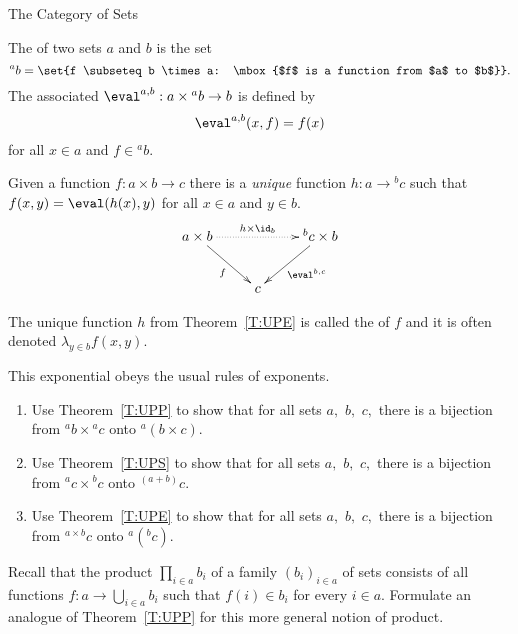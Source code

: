 \begin{unit}{The Category of Sets}
\begin{definition}
  The  of two sets \(a\) and \(b\) is the set \[{}^ab = \set{f \subseteq b \times a: \mbox{$f$ is a function from $a$ to $b$}}.\]
  The associated  \(\eval^{a,b}:a \times {}^ab \to b\) is defined by \[\eval^{a,b}(x,f) = f(x)\] for all \(x \in a\) and \(f \in {}^ab.\)  
\end{definition}

\begin{theorem}\label{T:UPE}
  Given a function \(f:a \times b \to c\) there is a \emph{unique} function \(h:a \to {}^bc\) such that \(f(x,y) = \eval(h(x),y)\) for all \(x \in a\) and \(y \in b.\)
  \[\xymatrix{
    a \times b \ar@{.>}[rr]^-{h \times \id_b} \ar[dr]_-{f} && {}^bc \times b \ar[dl]^-{\eval^{b,c}} \\
    & c
  }\]
\end{theorem}

\noindent
{}%
The unique function \(h\) from Theorem~\ref{T:UPE} is called the  of \(f\) and it is often denoted \(\lambda_{y \in b} f(x,y).\)

This exponential obeys the usual rules of exponents.

\begin{problem}\mbox{}
  \begin{enumerate}[\upshape(a)]
  \item Use Theorem~\ref{T:UPP} to show that for all sets \(a,\) \(b,\) \(c,\) there is a bijection from \({}^ab\times{}^ac\) onto \({}^a(b \times c).\)
  \item Use Theorem~\ref{T:UPS} to show that for all sets \(a,\) \(b,\) \(c,\) there is a bijection from \({}^ac\times{}^bc\) onto \({}^{(a+b)}c.\)
  \item Use Theorem~\ref{T:UPE} to show that for all sets \(a,\) \(b,\) \(c,\) there is a bijection from \({}^{a\times b}c\) onto \({}^a({}^bc).\)
  \end{enumerate}
\end{problem}

\begin{problem}\label{P:GenProd}
  Recall that the product \(\prod_{i \in a} b_i\) of a family \((b_i)_{i \in a}\) of sets consists of all functions \(f:a \to \bigcup_{i \in a} b_i\) such that \(f(i) \in b_i\) for every \(i \in a.\)
  Formulate an analogue of Theorem~\ref{T:UPP} for this more general notion of product.
\end{problem}


\end{unit}
